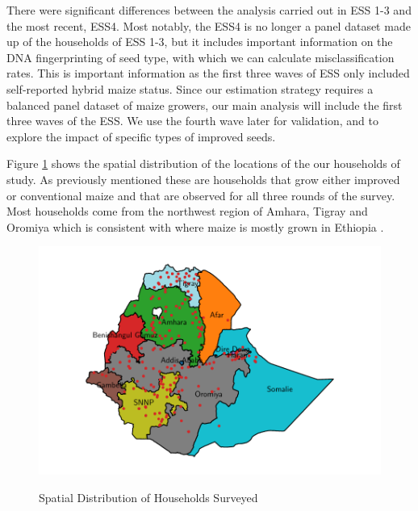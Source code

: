 \documentclass{article}
\begin{document}
There were significant differences between the analysis carried out in ESS 1-3 and the most recent, ESS4. Most notably, the ESS4 is no longer a panel dataset made up of the households of ESS 1-3, but it includes important information on the DNA fingerprinting of seed type, with which we can calculate misclassification rates. This is important information as the first three waves of ESS only included self-reported hybrid maize status. Since our estimation strategy requires a balanced panel dataset of maize growers, our main analysis will include the first three waves of the ESS. We use the fourth wave later for validation, and to explore the impact of specific types of improved seeds.

Figure \ref{map:regions} shows the spatial distribution of the locations of the our households of study. As previously mentioned these are households that grow either improved or conventional maize and that are observed for all three rounds of the survey. Most households come from the northwest region of Amhara, Tigray and Oromiya which is consistent with where maize is mostly grown in Ethiopia \citep{Abate2015-rj}.

\begin{figure}
    \centering
    \caption{Spatial Distribution of Households Surveyed}
    \includegraphics{results/figures/map_hhids.pdf}
    \label{map:regions}
\end{figure}
\end{document}
